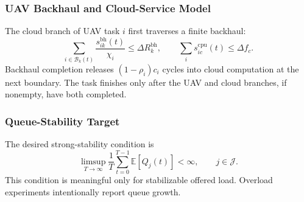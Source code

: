 \documentclass[journal]{IEEEtran}
\begin{document}
\subsubsection{UAV Backhaul and Cloud-Service Model}
The cloud branch of UAV task $i$ first traverses a finite backhaul:
\begin{equation}
\sum_{i\in\mathcal B_k(t)}
\frac{s_{ik}^{\mathrm{bh}}(t)}{\chi_i}
\le\Delta R_k^{\mathrm{bh}},
\qquad
\sum_i s_{ic}^{\mathrm{cpu}}(t)\le\Delta f_c.
\label{eq:cloud_capacity}
\end{equation}
Backhaul completion releases $(1-\rho_i)c_i$ cycles into cloud
computation at the next boundary.  The task finishes only after the UAV
and cloud branches, if nonempty, have both completed.

\subsubsection{Queue-Stability Target}
The desired strong-stability condition is
\begin{equation}
\limsup_{T\to\infty}\frac1T\sum_{t=0}^{T-1}
\mathbb E[Q_j(t)]<\infty,\qquad j\in\mathcal J.
\label{eq:stability}
\end{equation}
This condition is meaningful only for stabilizable offered load.
Overload experiments intentionally report queue growth.
\end{document}
